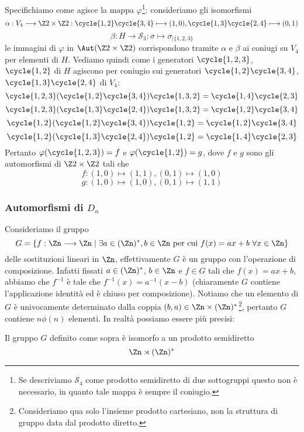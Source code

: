 \documentclass[11pt]{scrartcl}
\begin{document}
Specifichiamo come agisce la mappa $\varphi$\footnote{Se descriviamo $\mathcal{S}_4$ 
    come prodotto semidiretto di due sottogruppi questo non è 
    necessario, in quanto tale mappa è sempre il coniugio.
}:
consideriamo gli isomorfismi
\[
    \alpha: V_4\longrightarrow \Z2\times\Z2: \cycle{1, 2}\cycle{3, 4}\longmapsto (1, 0),
    \cycle{1, 3}\cycle{2, 4} \longmapsto (0, 1)
\]
\[
    \beta: H \longrightarrow \mathcal{S}_3: \sigma \longmapsto \sigma_{\mid\{1, 2, 3\}}
\]
le immagini di $\varphi$ in $\Aut(\Z2\times\Z2)$ corrispondono tramite $\alpha$
e $\beta$ ai coniugi su $V_4$ per elementi di $H$. Vediamo quindi come
i generatori $\cycle{1, 2, 3}$, $\cycle{1, 2}$ di $H$ agiscono per coniugio
sui generatori $\cycle{1, 2}\cycle{3, 4}$, $\cycle{1, 3}\cycle{2, 4}$ di $V_4$:
\[
    \cycle{1, 2, 3}(\cycle{1, 2}\cycle{3, 4})\cycle{1, 3, 2} = \cycle{1, 4}\cycle{2, 3}
\]
\[
    \cycle{1, 2, 3}(\cycle{1, 3}\cycle{2, 4})\cycle{1, 3, 2} = \cycle{1, 2}\cycle{3, 4}
\]
\[
    \cycle{1, 2}(\cycle{1, 2}\cycle{3, 4})\cycle{1, 2} = \cycle{1, 2}\cycle{3, 4}
\]
\[
    \cycle{1, 2}(\cycle{1, 3}\cycle{2, 4})\cycle{1, 2} = \cycle{1, 4}\cycle{2, 3}
\]
Pertanto $\varphi(\cycle{1, 2, 3}) = f$ e $\varphi(\cycle{1, 2}) = g$,
dove $f$ e $g$ sono gli automorfismi di $\Z2\times\Z2$ tali che
\[
    f: (1, 0)\longmapsto (1, 1), (0, 1) \longmapsto (1, 0)
\]
\[
    g: (1, 0)\longmapsto (1, 0), (0, 1) \longmapsto (1, 1)
\]

\subsubsection{Automorfismi di $D_n$}

Consideriamo il gruppo 
\[
    G = \{f: \Zn\longrightarrow\Zn\mid \exists a \in (\Zn)^*, b \in \Zn\text{ per cui }
    f(x) = ax + b~\forall x \in \Zn\}
\]
delle sostituzioni lineari in $\Zn$, effettivamente $G$ è un gruppo con 
l'operazione di composizione. Infatti fissati $a \in (\Zn)^*$, $b \in \Zn$ e
$f \in G$ tali che $f(x) = ax + b$, abbiamo che $f^{-1}$ è tale che 
$f^{-1}(x) = a^{-1}(x - b)$ (chiaramente $G$ contiene l'applicazione identità 
ed è chiuso per composizione). Notiamo che un elemento di $G$ è univocamente
determinato dalla coppia $(b, a) \in \Zn \times (\Zn)^*$\footnote{
    Consideriamo qua solo l'insieme prodotto cartesiano, non la struttura di 
    gruppo data dal prodotto diretto.
}, pertanto $G$
contiene $n\phi(n)$ elementi. In realtà possiamo essere più precisi:

\begin{proposition}
    Il gruppo $G$ definito come sopra è isomorfo a un prodotto semidiretto 
    \[
        \Zn \rtimes (\Zn)^*
    \]
\end{proposition}
\end{document}
